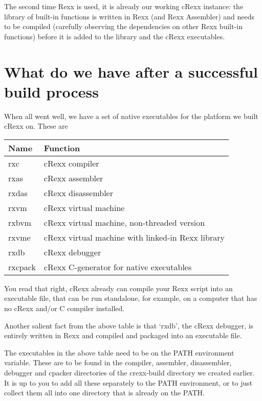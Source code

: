 The second time Rexx is used, it is already our working cRexx instance:
the library of built-in functions is written in Rexx (and Rexx
Assembler) and needs to be compiled (carefully observing the
dependencies on other Rexx built-in functions) before it is added to the
library and the cRexx executables.

\hypertarget{what-do-we-have-after-a-successful-build-process}{%
\section{What do we have after a successful build
process}\label{what-do-we-have-after-a-successful-build-process}}

When all went well, we have a set of native executables for the platform
we built cRexx on. These are

\begin{longtable}[]{@{}ll@{}}
\toprule
Name & Function \\
\midrule
\endhead
rxc & cRexx compiler \\
rxas & cRexx assembler \\
rxdas & cRexx disassembler \\
rxvm & cRexx virtual machine \\
rxbvm & cRexx virtual machine, non-threaded version \\
rxvme & cRexx virtual machine with linked-in Rexx library \\
rxdb & cRexx debugger \\
rxcpack & cRexx C-generator for native executables \\
\bottomrule
\end{longtable}

You read that right, cRexx already can compile your Rexx script into an
executable file, that can be run standalone, for example, on a computer
that has no cRexx and/or C compiler installed.

Another salient fact from the above table is that `rxdb', the cRexx
debugger, is entirely written in Rexx and compiled and packaged into an
executable file.

The executables in the above table need to be on the PATH environment
variable. These are to be found in the compiler, assembler,
disassembler, debugger and cpacker directories of the crexx-build
directory we created earlier. It is up to you to add all these
separately to the PATH environment, or to just collect them all into one
directory that is already on the PATH.

